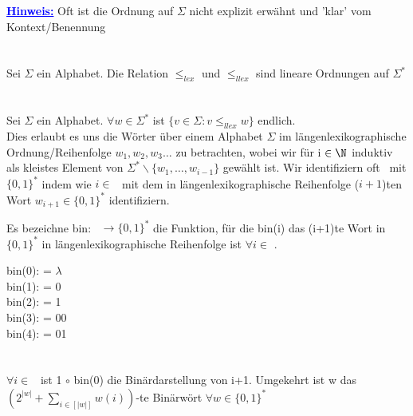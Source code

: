 \documentclass[a4paper]{article}
\begin{document}
\textcolor{blue}{\underline{\textbf{Hinweis:}}} Oft ist die Ordnung auf $\Sigma$ nicht explizit erwähnt und 'klar' vom Kontext/Benennung\\
\\
\stepBoxCounter
{} \\
Sei $\Sigma$ ein Alphabet. Die Relation $\leq_{lex}$ und $\leq_{llex}$ sind lineare Ordnungen auf $\Sigma^*$ \\
\\
 \\
Sei $\Sigma$ ein Alphabet. $\forall w \in \Sigma^*$ ist $\lbrace v \in \Sigma: v \leq_{llex} w \rbrace$ endlich. \\
Dies erlaubt es uns die Wörter über einem Alphabet $\Sigma$ im längenlexikographische Ordnung/Reihenfolge $w_1,w_2,w_3 \dots$ zu betrachten, wobei wir für i $\in \N$ induktiv als kleistes Element von $\Sigma^* \backslash \lbrace w_1,\dots,w_{i-1} \rbrace$ gewählt ist. Wir identifiziern oft \NN \ mit $\lbrace 0,1 \rbrace^*$ indem wie $i \in$ \NN \ mit dem in längenlexikographische Reihenfolge ($i+1$)ten Wort $w_{i+1} \in \lbrace 0,1 \rbrace^*$ identifiziern.


\begin{DefBox}{}
Es bezeichne bin: \NN \ $\rightarrow \lbrace 0,1 \rbrace^*$ die Funktion, für die bin(i) das (i+1)te Wort in $\lbrace 0,1 \rbrace^*$ in längenlexikographische Reihenfolge ist $\forall i \in$ \NN.
\end{DefBox}

bin(0): = $\lambda$ \\
bin(1): = 0 \\
bin(2): = 1 \\
bin(3): = 00 \\
bin(4): = 01 \\
\\
 \\
$\forall i \in$ \NN \ ist 1 $\circ$ bin(0) die Binärdarstellung von i+1. Umgekehrt ist w das $(2^{|w|} + \displaystyle\sum_{i \in [|w|]} w(i))$-te Binärwört $\forall w \in \lbrace 0,1 \rbrace^*$

\stepDefCounter
{}
\end{document}
